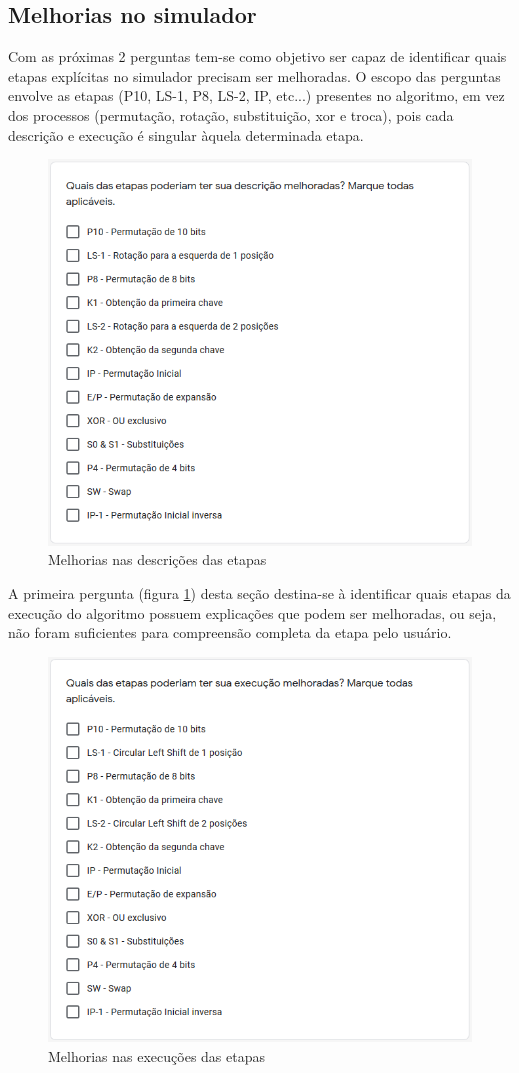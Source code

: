 \subsection{Melhorias no simulador}
Com as próximas 2 perguntas tem-se como objetivo ser capaz de identificar quais etapas explícitas no simulador precisam ser melhoradas. O escopo das perguntas envolve as etapas (P10, LS-1, P8, LS-2, IP, etc...) presentes no algoritmo, em vez dos processos (permutação, rotação, substituição, xor e troca), pois cada descrição e execução é singular àquela determinada etapa.

\begin{figure}[H]
    \centering
    \caption{Melhorias nas descrições das etapas}
    \label{fig:melhoriadescricoes}
    \includegraphics[width=0.7\linewidth]{Questionario/Q5.png}
\end{figure}

A primeira pergunta (figura \ref{fig:melhoriadescricoes}) desta seção destina-se à identificar quais etapas da execução do algoritmo possuem explicações que podem ser melhoradas, ou seja, não foram suficientes para compreensão completa da etapa pelo usuário.

\begin{figure}[H]
    \centering
    \caption{Melhorias nas execuções das etapas}
    \label{fig:melhoriaexecucoes}
    \includegraphics[width=0.7\linewidth]{Questionario/Q6.png}
\end{figure}

